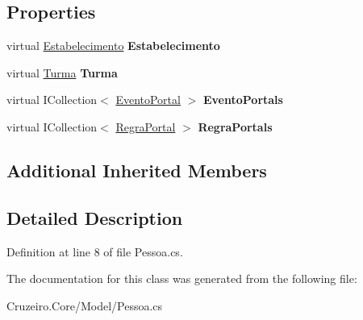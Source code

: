 \subsection*{Properties}
\begin{DoxyCompactItemize}
\item 
virtual \hyperlink{class_cruzeiro_1_1_core_1_1_model_1_1_estabelecimento}{Estabelecimento} {\bfseries Estabelecimento}\hypertarget{class_cruzeiro_1_1_core_1_1_model_1_1_pessoa_a7ea5f7b9e8562df454ee26556a61aa01}{}\label{class_cruzeiro_1_1_core_1_1_model_1_1_pessoa_a7ea5f7b9e8562df454ee26556a61aa01}

\item 
virtual \hyperlink{class_cruzeiro_1_1_core_1_1_model_1_1_turma}{Turma} {\bfseries Turma}\hypertarget{class_cruzeiro_1_1_core_1_1_model_1_1_pessoa_a154b3d1a8abab3d6295007612894894b}{}\label{class_cruzeiro_1_1_core_1_1_model_1_1_pessoa_a154b3d1a8abab3d6295007612894894b}

\item 
virtual I\+Collection$<$ \hyperlink{class_cruzeiro_1_1_core_1_1_model_1_1_evento_portal}{Evento\+Portal} $>$ {\bfseries Evento\+Portals}\hypertarget{class_cruzeiro_1_1_core_1_1_model_1_1_pessoa_ab1679261c525a298d62be1c766aa53ae}{}\label{class_cruzeiro_1_1_core_1_1_model_1_1_pessoa_ab1679261c525a298d62be1c766aa53ae}

\item 
virtual I\+Collection$<$ \hyperlink{class_cruzeiro_1_1_core_1_1_model_1_1_regra_portal}{Regra\+Portal} $>$ {\bfseries Regra\+Portals}\hypertarget{class_cruzeiro_1_1_core_1_1_model_1_1_pessoa_abccb13e46f5acc32f141dbf34c396df6}{}\label{class_cruzeiro_1_1_core_1_1_model_1_1_pessoa_abccb13e46f5acc32f141dbf34c396df6}

\end{DoxyCompactItemize}
\subsection*{Additional Inherited Members}


\subsection{Detailed Description}


Definition at line 8 of file Pessoa.\+cs.



The documentation for this class was generated from the following file\+:\begin{DoxyCompactItemize}
\item 
Cruzeiro.\+Core/\+Model/Pessoa.\+cs\end{DoxyCompactItemize}
